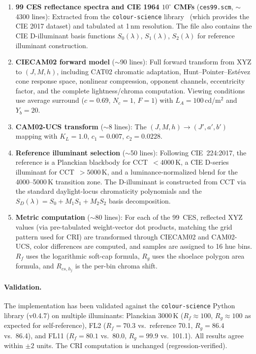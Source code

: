 \documentclass[11pt]{article}
\begin{document}
\begin{enumerate}
\item \textbf{99 CES reflectance spectra and CIE 1964 $10^\circ$ CMFs}
  (\texttt{ces99.scm}, $\sim$4300 lines): Extracted from the
  \texttt{colour-science} library~\cite{colour-science} (which
  provides the CIE 2017 dataset) and tabulated at 1\,nm resolution.
  The file also contains the CIE D-illuminant basis functions
  $S_0(\lambda)$, $S_1(\lambda)$, $S_2(\lambda)$ for reference
  illuminant construction.

\item \textbf{CIECAM02 forward model} ($\sim$90 lines): Full forward
  transform from XYZ to $(J, M, h)$, including CAT02 chromatic
  adaptation, Hunt--Pointer--Est\'{e}vez cone response space,
  nonlinear compression, opponent channels, eccentricity factor,
  and the complete lightness/chroma computation.  Viewing conditions
  use average surround ($c = 0.69$, $N_c = 1$, $F = 1$) with
  $L_A = 100$\,cd/m$^2$ and $Y_b = 20$.

\item \textbf{CAM02-UCS transform} ($\sim$8 lines): The
  $(J, M, h) \to (J', a', b')$ mapping with $K_L = 1.0$,
  $c_1 = 0.007$, $c_2 = 0.0228$.

\item \textbf{Reference illuminant selection} ($\sim$50 lines):
  Following CIE~224:2017, the reference is a Planckian blackbody for
  CCT~$< 4000$\,K, a CIE D-series illuminant for CCT~$> 5000$\,K,
  and a luminance-normalized blend for the 4000--5000\,K transition
  zone.  The D-illuminant is constructed from CCT via the standard
  daylight-locus chromaticity polynomials and the
  $S_D(\lambda) = S_0 + M_1 S_1 + M_2 S_2$ basis decomposition.

\item \textbf{Metric computation} ($\sim$80 lines): For each of
  the 99~CES, reflected XYZ values (via pre-tabulated weight-vector
  dot products, matching the grid pattern used for CRI) are
  transformed through CIECAM02 and CAM02-UCS, color differences
  are computed, and samples are assigned to 16 hue bins.  $R_f$ uses
  the logarithmic soft-cap formula, $R_g$ uses the shoelace polygon
  area formula, and $R_{cs,h_j}$ is the per-bin chroma shift.
\end{enumerate}

\paragraph{Validation.}
The implementation has been validated against the \texttt{colour-science}
Python library (v0.4.7) on multiple illuminants: Planckian 3000\,K
($R_f \approx 100$, $R_g \approx 100$ as expected for self-reference),
FL2 ($R_f = 70.3$ vs.\ reference 70.1, $R_g = 86.4$ vs.\ 86.4),
and FL11 ($R_f = 80.1$ vs.\ 80.0, $R_g = 99.9$ vs.\ 101.1).
All results agree within $\pm 2$ units.  The CRI computation is
unchanged (regression-verified).
\end{document}
